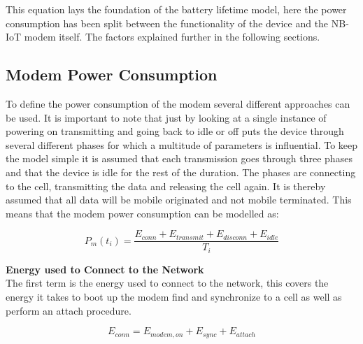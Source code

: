 This equation lays the foundation of the battery lifetime model, here the power consumption has been split between the functionality of the device and the NB-IoT modem itself. The factors explained further in the following sections.

\subsection{Modem Power Consumption}

To define the power consumption of the modem several different approaches can be used. It is important to note that just by looking at a single instance of powering on transmitting and going back to idle or off puts the device through several different phases for which a multitude of parameters is influential. To keep the model simple it is assumed that each transmission goes through three phases and that the device is idle for the rest of the duration. The phases are connecting to the cell, transmitting the data and releasing the cell again. It is thereby assumed that all data will be mobile originated and not mobile terminated. This means that the modem power consumption can be modelled as:

\begin{equation}
P_m(t_i) = \frac{E_{conn} + E_{transmit} + E_{disconn} + E_{idle}}{T_i}
\end{equation}
\begin{where}
\end{where}


\textbf{Energy used to Connect to the Network}\\
The first term is the energy used to connect to the network, this covers the energy it takes to boot up the modem find and synchronize to a cell as well as perform an attach procedure. 

\begin{equation}
E_{conn} = E_{modem,on} + E_{sync} + E_{attach}
\end{equation}
\begin{where}
\end{where}

